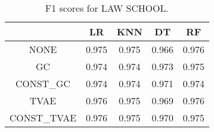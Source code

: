 \begin{table}
\caption{F1 scores for LAW SCHOOL.}
\label{tab:f1-LAW SCHOOL}
\begin{tabular}{ccccc}
\toprule
 & LR & KNN & DT & RF \\
\midrule
NONE & 0.975 & 0.975 & 0.966 & 0.976 \\
GC & 0.974 & 0.974 & 0.973 & 0.975 \\
CONST\_GC & 0.974 & 0.974 & 0.971 & 0.974 \\
TVAE & 0.976 & 0.975 & 0.969 & 0.976 \\
CONST\_TVAE & 0.976 & 0.975 & 0.970 & 0.975 \\
\bottomrule
\end{tabular}
\end{table}
